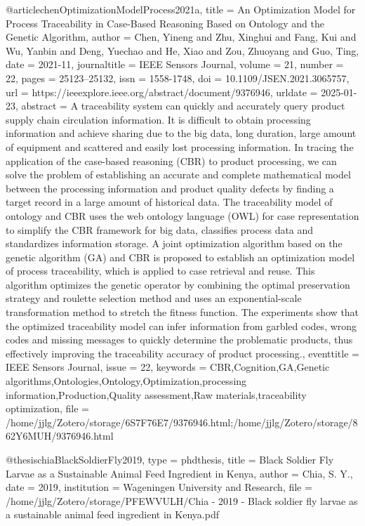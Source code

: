 {{{@article{chenOptimizationModelProcess2021a,
  title = {An {{Optimization Model}} for {{Process Traceability}} in {{Case-Based Reasoning Based}} on {{Ontology}} and the {{Genetic Algorithm}}},
  author = {Chen, Yineng and Zhu, Xinghui and Fang, Kui and Wu, Yanbin and Deng, Yuechao and He, Xiao and Zou, Zhuoyang and Guo, Ting},
  date = {2021-11},
  journaltitle = {IEEE Sensors Journal},
  volume = {21},
  number = {22},
  pages = {25123--25132},
  issn = {1558-1748},
  doi = {10.1109/JSEN.2021.3065757},
  url = {https://ieeexplore.ieee.org/abstract/document/9376946},
  urldate = {2025-01-23},
  abstract = {A traceability system can quickly and accurately query product supply chain circulation information. It is difficult to obtain processing information and achieve sharing due to the big data, long duration, large amount of equipment and scattered and easily lost processing information. In tracing the application of the case-based reasoning (CBR) to product processing, we can solve the problem of establishing an accurate and complete mathematical model between the processing information and product quality defects by finding a target record in a large amount of historical data. The traceability model of ontology and CBR uses the web ontology language (OWL) for case representation to simplify the CBR framework for big data, classifies process data and standardizes information storage. A joint optimization algorithm based on the genetic algorithm (GA) and CBR is proposed to establish an optimization model of process traceability, which is applied to case retrieval and reuse. This algorithm optimizes the genetic operator by combining the optimal preservation strategy and roulette selection method and uses an exponential-scale transformation method to stretch the fitness function. The experiments show that the optimized traceability model can infer information from garbled codes, wrong codes and missing messages to quickly determine the problematic products, thus effectively improving the traceability accuracy of product processing.},
  eventtitle = {{{IEEE Sensors Journal}}},
  issue = {22},
  keywords = {CBR,Cognition,GA,Genetic algorithms,Ontologies,Ontology,Optimization,processing information,Production,Quality assessment,Raw materials,traceability optimization},
  file = {/home/jjlg/Zotero/storage/6S7F76E7/9376946.html;/home/jjlg/Zotero/storage/862Y6MUH/9376946.html}
}

@thesis{chiaBlackSoldierFly2019,
  type = {phdthesis},
  title = {Black Soldier Fly Larvae as a Sustainable Animal Feed Ingredient in {{Kenya}}},
  author = {Chia, S. Y.},
  date = {2019},
  institution = {{Wageningen University and Research}},
  file = {/home/jjlg/Zotero/storage/PFEWVULH/Chia - 2019 - Black soldier fly larvae as a sustainable animal feed ingredient in Kenya.pdf}
}

}}}
